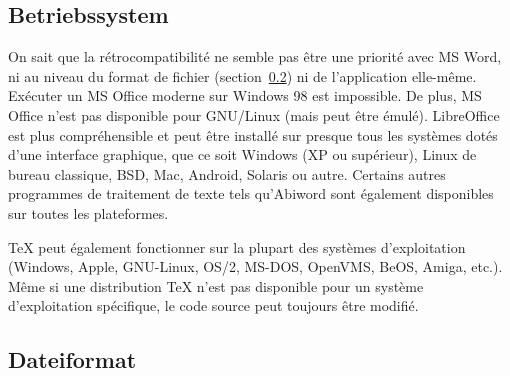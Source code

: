 \documentclass[11pt,a4paper,ngerman,french,DIV=8]{scrartcl}
\begin{document}
\subsection{Betriebssystem}

On sait que la rétrocompatibilité ne semble pas être une priorité avec MS Word, ni au niveau du format de fichier (section~\ref{sec:dateiformat}) ni de l'application elle-même. Exécuter un MS Office moderne sur Windows 98 est impossible. De plus, MS Office n'est pas disponible pour GNU/Linux (mais peut être émulé). LibreOffice est plus compréhensible et peut être installé sur presque tous les systèmes dotés d'une interface graphique, que ce soit Windows (XP ou supérieur), Linux de bureau classique, BSD, Mac, Android, Solaris ou autre. Certains autres programmes de traitement de texte tels qu'Abiword sont également disponibles sur toutes les plateformes.

\TeX{} peut également fonctionner sur la plupart des systèmes d'exploitation (Windows, Apple, GNU-Linux, OS/2, MS-DOS, OpenVMS, BeOS, Amiga, etc.). Même si une distribution \TeX{} n'est pas disponible pour un système d'exploitation spécifique, le code source peut toujours être modifié.

\subsection{Dateiformat}\label{sec:dateiformat}
\end{document}
